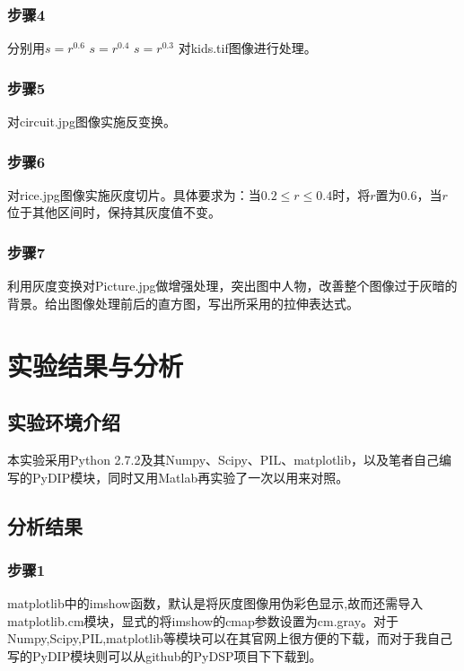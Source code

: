 \documentclass[]{IEEEphot}
\begin{document}
\subsubsection{步骤4}
分别用$s=r^{0.6}$ $s=r^{0.4}$ $s=r^{0.3}$ 对kids.tif图像进行处理。
\subsubsection{步骤5}
对circuit.jpg图像实施反变换。
\subsubsection{步骤6}
对rice.jpg图像实施灰度切片。具体要求为：当$0.2\leq r\leq 0.4$时，将$r$置为0.6，当$r$位于其他区间时，保持其灰度值不变。
\subsubsection{步骤7}
利用灰度变换对Picture.jpg做增强处理，突出图中人物，改善整个图像过于灰暗的背景。给出图像处理前后的直方图，写出所采用的拉伸表达式。
\section{实验结果与分析}
\subsection{实验环境介绍}
本实验采用Python 2.7.2及其Numpy、Scipy、PIL、matplotlib，以及笔者自己编写的PyDIP模块，同时又用Matlab再实验了一次以用来对照。
\subsection{分析结果}
\subsubsection{步骤1}
matplotlib中的imshow函数，默认是将灰度图像用伪彩色显示,故而还需导入matplotlib.cm模块，显式的将imshow的cmap参数设置为cm.gray。对于Numpy,Scipy,PIL,matplotlib等模块可以在其官网上很方便的下载，而对于我自己写的PyDIP模块则可以从github的PyDSP项目下下载到。
\end{document}
